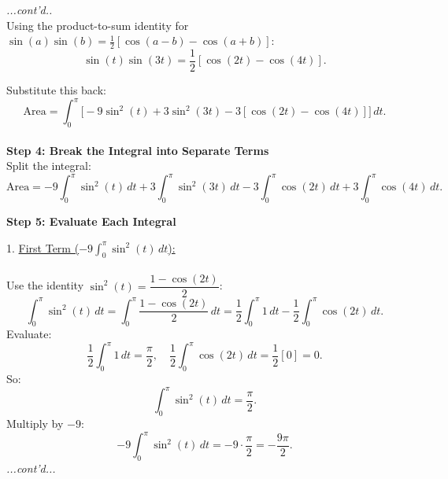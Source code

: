 \documentclass{article}
\begin{document}
\begin{exercisebox}
    \begin{solutionbox}
    \textit{...cont'd..} \\

    Using the product-to-sum identity for \( \sin(a)\sin(b) = \frac{1}{2}[\cos(a-b) - \cos(a+b)] \):
    \[
        \sin(t)\sin(3t) = \frac{1}{2}[\cos(2t) - \cos(4t)].
    \]
        
    Substitute this back:
    \[
        \text{Area} = \int_{0}^{\pi} \big[-9\sin^2(t) + 3\sin^2(3t) - 3[\cos(2t) - \cos(4t)]\big] \, dt.
    \]
    \\
    \textbf{Step 4: Break the Integral into Separate Terms} \\
    Split the integral:
    \[
        \text{Area} = -9\int_{0}^{\pi} \sin^2(t) \, dt + 3\int_{0}^{\pi} \sin^2(3t) \, dt - 3\int_{0}^{\pi} \cos(2t) \, dt + 3\int_{0}^{\pi} \cos(4t) \, dt.
    \]

    \textbf{Step 5: Evaluate Each Integral}  

    1. \underline{First Term (\(-9\int_{0}^{\pi} \sin^2(t) \, dt\)):} \\
    \\
       Use the identity \( \sin^2(t) = \dfrac{1 - \cos(2t)}{2} \):
       \[
           \int_{0}^{\pi} \sin^2(t) \, dt = \int_{0}^{\pi} \frac{1 - \cos(2t)}{2} \, dt = \frac{1}{2} \int_{0}^{\pi} 1 \, dt - \frac{1}{2} \int_{0}^{\pi} \cos(2t) \, dt.
       \]
       Evaluate:
       \[
           \frac{1}{2} \int_{0}^{\pi} 1 \, dt = \frac{\pi}{2}, \quad \frac{1}{2} \int_{0}^{\pi} \cos(2t) \, dt = \frac{1}{2}[0] = 0.
       \]
       So:
       \[
           \int_{0}^{\pi} \sin^2(t) \, dt = \frac{\pi}{2}.
       \]
       Multiply by \(-9\):
       \[
           -9\int_{0}^{\pi} \sin^2(t) \, dt = -9 \cdot \frac{\pi}{2} = -\frac{9\pi}{2}.
       \]
    \textit{...cont'd...}
    \end{solutionbox}
\end{exercisebox}
\end{document}
